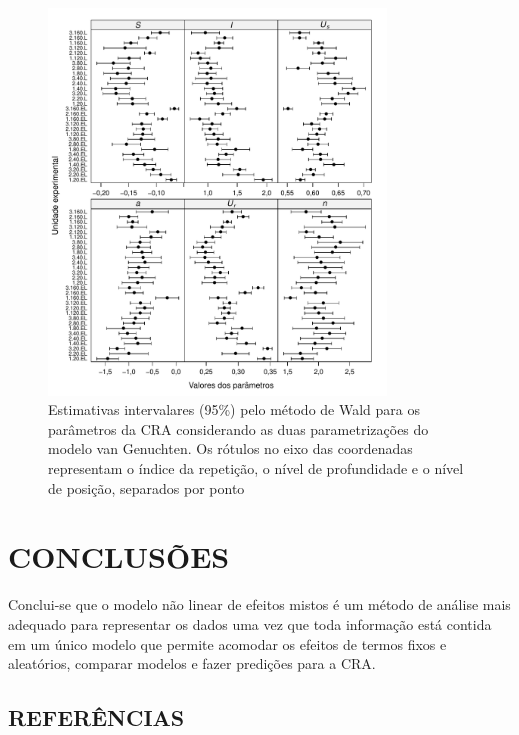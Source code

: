 \begin{figure}[H]
 \begin{center}
 \includegraphics[width=0.8\textwidth]{../figuras/param_ic.pdf}
\end{center}
 \caption{Estimativas intervalares (95\%) pelo método de Wald para os
   parâmetros da CRA considerando as duas parametrizações do modelo
   van Genuchten.  Os rótulos no eixo das coordenadas representam o
   índice da repetição, o nível de profundidade e o nível de posição,
   separados por ponto}
 \label{fg-ICpar}
\end{figure}

\newpage
\section{CONCLUSÕES}\label{sc-conclusion}

Conclui-se que o modelo não linear de efeitos mistos é um método de
análise mais adequado para representar os dados uma vez que toda
informação está contida em um único modelo que permite acomodar os
efeitos de termos fixos e aleatórios, comparar modelos e fazer
predições para a CRA.

\newpage
{}
\begin{center}
\section*{REFERÊNCIAS} 
\end{center}

